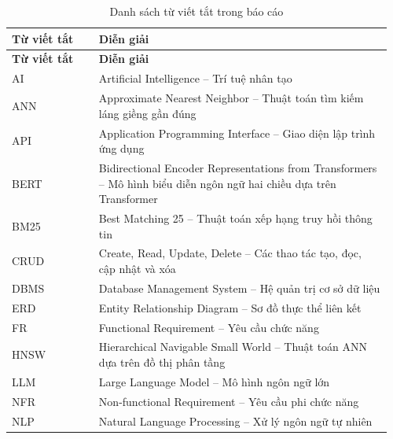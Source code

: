 
\begin{longtable}{@{}p{0.22\linewidth}p{0.74\linewidth}@{}}
\caption{Danh sách từ viết tắt trong báo cáo}
\label{tab:abbreviations} \\

\toprule
\textbf{Từ viết tắt} & \textbf{Diễn giải} \\
\midrule
\endfirsthead

\toprule
\textbf{Từ viết tắt} & \textbf{Diễn giải} \\
\midrule
\endhead
AI   & Artificial Intelligence -- Trí tuệ nhân tạo \\

ANN  & Approximate Nearest Neighbor -- Thuật toán tìm kiếm láng giềng gần đúng \\

API  & Application Programming Interface -- Giao diện lập trình ứng dụng \\

BERT & Bidirectional Encoder Representations from Transformers -- Mô hình biểu diễn ngôn ngữ hai chiều dựa trên Transformer \\

BM25 & Best Matching 25 -- Thuật toán xếp hạng truy hồi thông tin \\

CRUD & Create, Read, Update, Delete -- Các thao tác tạo, đọc, cập nhật và xóa \\

DBMS & Database Management System -- Hệ quản trị cơ sở dữ liệu \\

ERD  & Entity Relationship Diagram -- Sơ đồ thực thể liên kết \\

FR   & Functional Requirement -- Yêu cầu chức năng \\

HNSW & Hierarchical Navigable Small World -- Thuật toán ANN dựa trên đồ thị phân tầng \\

LLM  & Large Language Model -- Mô hình ngôn ngữ lớn \\

NFR  & Non-functional Requirement -- Yêu cầu phi chức năng \\

NLP  & Natural Language Processing -- Xử lý ngôn ngữ tự nhiên \\


\end{longtable}
